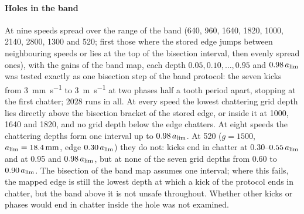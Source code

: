 \paragraph{Holes in the band} At nine speeds spread over the range of the band (640, 960, 1640, 1820, 1000, 2140, 2800, 1300 and \SI{520}{\rpm}; first those where the stored edge jumps between neighbouring speeds or lies at the top of the bisection interval, then evenly spread ones), with the gains of the band map, each depth $0.05,0.10,\dots,0.95$ and $0.98\,a_{\lim}$ was tested exactly as one bisection step of the band protocol: the seven kicks from \SI{3}{\milli\metre\per\second} to \SI{3}{\metre\per\second} at two phases half a tooth period apart, stopping at the first chatter; 2028 runs in all. At every speed the lowest chattering grid depth lies directly above the bisection bracket of the stored edge, or inside it at 1000, 1640 and \SI{1820}{\rpm}, and no grid depth below the edge chatters. At eight speeds the chattering depths form one interval up to $0.98\,a_{\lim}$. At \SI{520}{\rpm} ($g=1500$, $a_{\lim}=\SI{18.4}{\milli\metre}$, edge $0.30\,a_{\lim}$) they do not: kicks end in chatter at 0.30--$0.55\,a_{\lim}$ and at 0.95 and $0.98\,a_{\lim}$, but at none of the seven grid depths from 0.60 to $0.90\,a_{\lim}$. The bisection of the band map assumes one interval; where this fails, the mapped edge is still the lowest depth at which a kick of the protocol ends in chatter, but the band above it is not unsafe throughout. Whether other kicks or phases would end in chatter inside the hole was not examined.

